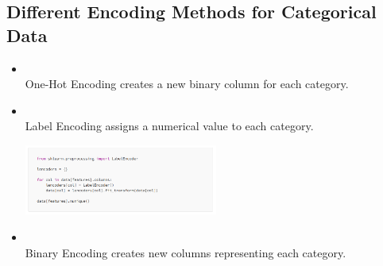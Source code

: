\documentclass{article}
\begin{document}
\subsection{Different Encoding Methods for Categorical Data}
\begin{itemize}
    \item \textbf{\textcolor{blue}{}}\\
    One-Hot Encoding creates a new binary column for each category.
    
    \item \textbf{\textcolor{blue}{}}\\
    Label Encoding assigns a numerical value to each category.
    \begin{center}
        \includegraphics[width=0.5\textwidth]{label encoding} %
    \end{center}
    \item \textbf{\textcolor{blue}{}}\\
    Binary Encoding creates new columns representing each category.
\end{itemize}
\end{document}
